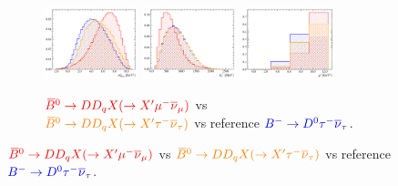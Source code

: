 \begin{figure}[!htb]
    \begin{subfigure}{\textwidth}
        \centering
        \includegraphics[width=0.3\textwidth]{figs-fit-fit-templates/histo-comp/D0_iso_D0Tau__vs__D0_iso_dDDMu__vs__D0_iso_dDDTau__m2miss.pdf}
        \includegraphics[width=0.3\textwidth]{figs-fit-fit-templates/histo-comp/D0_iso_D0Tau__vs__D0_iso_dDDMu__vs__D0_iso_dDDTau__el.pdf}
        \includegraphics[width=0.3\textwidth]{figs-fit-fit-templates/histo-comp/D0_iso_D0Tau__vs__D0_iso_dDDMu__vs__D0_iso_dDDTau__q2.pdf}
        \caption{
            $\textcolor{red}{{{\kern 0.18em\overline{\kern -0.18em B}}{}^0} \rightarrow D D_q X (\rightarrow X'{\mu^-}{{\overline{\nu}}_\mu})}$
            vs
            $\textcolor{orange}{{{\kern 0.18em\overline{\kern -0.18em B}}{}^0} \rightarrow D D_q X (\rightarrow X'{\tau^-}{{\overline{\nu}}_\tau})}$
            vs reference
            $\textcolor{blue}{{{{B}^-}} \rightarrow {\ensuremath{{D}^0}}{\ensuremath{\tau^-}}{\ensuremath{{\overline{\nu}}_\tau}}}$.
        }
    \end{subfigure}


\end{figure}
